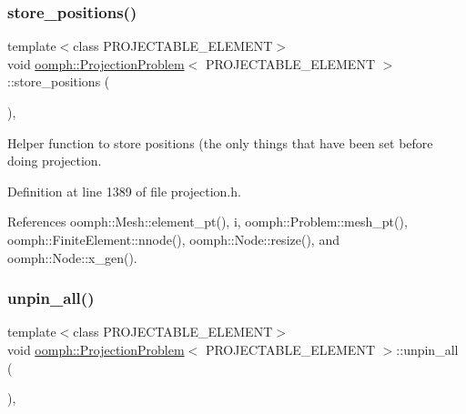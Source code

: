 \subsubsection{\texorpdfstring{store\+\_\+positions()}{store\_positions()}}
{\footnotesize\ttfamily template$<$class P\+R\+O\+J\+E\+C\+T\+A\+B\+L\+E\+\_\+\+E\+L\+E\+M\+E\+NT$>$ \\
void \hyperlink{classoomph_1_1ProjectionProblem}{oomph\+::\+Projection\+Problem}$<$ P\+R\+O\+J\+E\+C\+T\+A\+B\+L\+E\+\_\+\+E\+L\+E\+M\+E\+NT $>$\+::store\+\_\+positions (\begin{DoxyParamCaption}{ }\end{DoxyParamCaption})\hspace{0.3cm}{\ttfamily [inline]}, {\ttfamily [private]}}



Helper function to store positions (the only things that have been set before doing projection. 



Definition at line 1389 of file projection.\+h.



References oomph\+::\+Mesh\+::element\+\_\+pt(), i, oomph\+::\+Problem\+::mesh\+\_\+pt(), oomph\+::\+Finite\+Element\+::nnode(), oomph\+::\+Node\+::resize(), and oomph\+::\+Node\+::x\+\_\+gen().

\mbox{\label{classoomph_1_1ProjectionProblem_ac0b06207d156be752a3fccfab654826e}} 
\subsubsection{\texorpdfstring{unpin\+\_\+all()}{unpin\_all()}}
{\footnotesize\ttfamily template$<$class P\+R\+O\+J\+E\+C\+T\+A\+B\+L\+E\+\_\+\+E\+L\+E\+M\+E\+NT$>$ \\
void \hyperlink{classoomph_1_1ProjectionProblem}{oomph\+::\+Projection\+Problem}$<$ P\+R\+O\+J\+E\+C\+T\+A\+B\+L\+E\+\_\+\+E\+L\+E\+M\+E\+NT $>$\+::unpin\+\_\+all (\begin{DoxyParamCaption}{ }\end{DoxyParamCaption})\hspace{0.3cm}{\ttfamily [inline]}, {\ttfamily [private]}}



